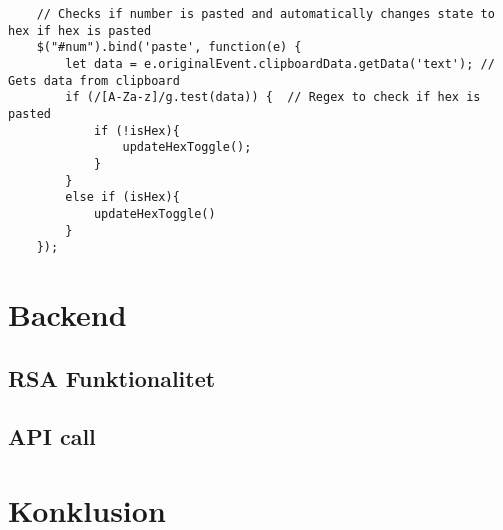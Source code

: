 \documentclass{article}
\begin{document}
    \begin{verbatim}
    // Checks if number is pasted and automatically changes state to hex if hex is pasted
    $("#num").bind('paste', function(e) {
        let data = e.originalEvent.clipboardData.getData('text'); // Gets data from clipboard
        if (/[A-Za-z]/g.test(data)) {  // Regex to check if hex is pasted
            if (!isHex){
                updateHexToggle();
            }
        }
        else if (isHex){
            updateHexToggle()
        }
    });
    \end{verbatim}


    \section{Backend}\label{sec:backend}

    \subsection{RSA Funktionalitet}\label{subsec:rsa-funktionalitet}

    \subsection{API call}\label{subsec:api-call}


    \section{Konklusion}\label{sec:konklusion}

    
    
\end{document}
